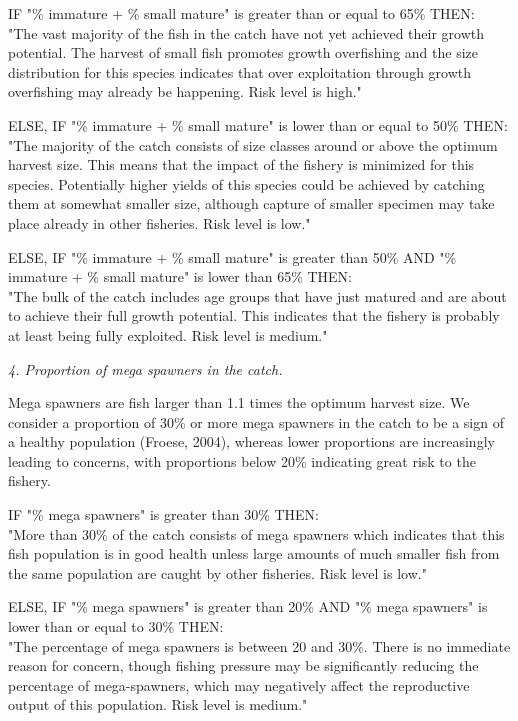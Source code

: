 \clearpage
\newpage

IF "\% immature + \% small mature" is greater than or equal to 65\% THEN:\\[0cm]
"The vast majority of the fish in the catch have not yet achieved their growth potential. The harvest of small fish promotes growth overfishing and the size distribution for this species indicates that over exploitation through growth overfishing may already be happening. Risk level is high."

ELSE, IF "\% immature + \% small mature" is lower than or equal to 50\% THEN:\\[0cm]
"The majority of the catch consists of size classes around or above the optimum harvest size. This means that the impact of the fishery is minimized for this species. Potentially higher yields of this species could be achieved by catching them at somewhat smaller size, although capture of smaller specimen may take place already in other fisheries. Risk level is low."

ELSE, IF "\% immature + \% small mature" is greater than 50\% AND "\% immature + \% small mature" is lower than 65\% THEN:\\[0cm]
"The bulk of the catch includes age groups that have just matured and are about to achieve their full growth potential. This indicates that the fishery is probably at least being fully exploited. Risk level is medium."

\textit{4. Proportion of mega spawners in the catch.}

Mega spawners are fish larger than 1.1 times the optimum harvest size. We consider a proportion of 30\% or more mega spawners in the catch to be a sign of a healthy population (Froese, 2004), whereas lower proportions are increasingly leading to concerns, with proportions below 20\% indicating great risk to the fishery.

IF "\% mega spawners" is greater than 30\% THEN:\\[0cm]
"More than 30\% of the catch consists of mega spawners which indicates that this fish population is in good health unless large amounts of much smaller fish from the same population are caught by other fisheries. Risk level is low."

ELSE, IF "\% mega spawners" is greater than 20\% AND "\% mega spawners" is lower than or equal to 30\% THEN:\\[0cm]
"The percentage of mega spawners is between 20 and 30\%.  There is no immediate reason for concern, though fishing pressure may be significantly reducing the percentage of mega-spawners, which may negatively affect the reproductive output of this population. Risk level is medium."

